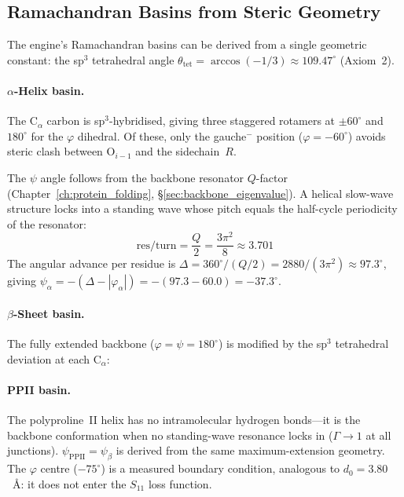 \subsection{Ramachandran Basins from Steric Geometry}
\label{sec:rama_derived}

The engine's Ramachandran basins can be derived from a single
geometric constant: the sp$^3$ tetrahedral angle
$\theta_\text{tet} = \arccos(-1/3) \approx 109.47^\circ$ (Axiom~2).

\paragraph{$\alpha$-Helix basin.}
The C$_\alpha$ carbon is sp$^3$-hybridised, giving three staggered
rotamers at $\pm 60^\circ$ and $180^\circ$ for the $\varphi$ dihedral.
Of these, only the gauche$^-$ position ($\varphi = -60^\circ$) avoids
steric clash between O$_{i-1}$ and the sidechain~$R$.

The $\psi$ angle follows from the backbone resonator $Q$-factor
(Chapter~\ref{ch:protein_folding}, \S\ref{sec:backbone_eigenvalue}).
A helical slow-wave structure locks into a standing wave whose pitch
equals the half-cycle periodicity of the resonator:
\begin{equation}
    \text{res/turn} = \frac{Q}{2} = \frac{3\pi^2}{8} \approx 3.701
    \label{eq:helix_pitch}
\end{equation}
The angular advance per residue is $\Delta = 360^\circ / (Q/2)
= 2880/(3\pi^2) \approx 97.3^\circ$, giving
$\psi_\alpha = -(\Delta - |\varphi_\alpha|) = -(97.3 - 60.0) =
-37.3^\circ$.

\paragraph{$\beta$-Sheet basin.}
The fully extended backbone ($\varphi = \psi = 180^\circ$) is
modified by the sp$^3$ tetrahedral deviation at each C$_\alpha$:

\paragraph{PPII basin.}
The polyproline~II helix has no intramolecular hydrogen bonds---it is
the backbone conformation when no standing-wave resonance locks in
($\Gamma \to 1$ at all junctions).  $\psi_\text{PPII} = \psi_\beta$
is derived from the same maximum-extension geometry.  The $\varphi$
centre ($-75^\circ$) is a measured boundary condition, analogous to
$d_0 = 3.80$~\AA: it does not enter the $S_{11}$ loss function.

